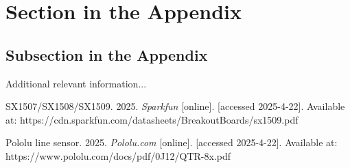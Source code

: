 \documentclass[english]{article}
\begin{document}




\clearpage
\appendix

\section{Section in the Appendix}
\label{sec:app1}

\subsection{Subsection in the Appendix}
\label{subsec:app2}

Additional relevant information...


\begin{thebibliography}{1}
	
	SX1507/SX1508/SX1509. 2025. \textit{Sparkfun} [online]. [accessed 2025-4-22]. Available at: https://cdn.sparkfun.com/datasheets/BreakoutBoards/sx1509.pdf
	
	Pololu line sensor. 2025. \textit{Pololu.com} [online]. [accessed 2025-4-22]. Available at: https://www.pololu.com/docs/pdf/0J12/QTR-8x.pdf

\end{thebibliography}
\end{document}
